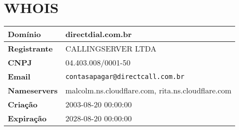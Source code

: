 
\section{WHOIS}
\begin{tabular}{|l|l|}
\hline
\textbf{Domínio} & directdial.com.br \\ \hline
\textbf{Registrante} & CALLINGSERVER LTDA \\ \hline
\textbf{CNPJ} & 04.403.008/0001-50 \\ \hline
\textbf{Email} & \texttt{contasapagar@directcall.com.br} \\ \hline
\textbf{Nameservers} & malcolm.ns.cloudflare.com, rita.ns.cloudflare.com \\ \hline
\textbf{Criação} & 2003-08-20 00:00:00 \\ \hline
\textbf{Expiração} & 2028-08-20 00:00:00 \\ \hline
\end{tabular}
